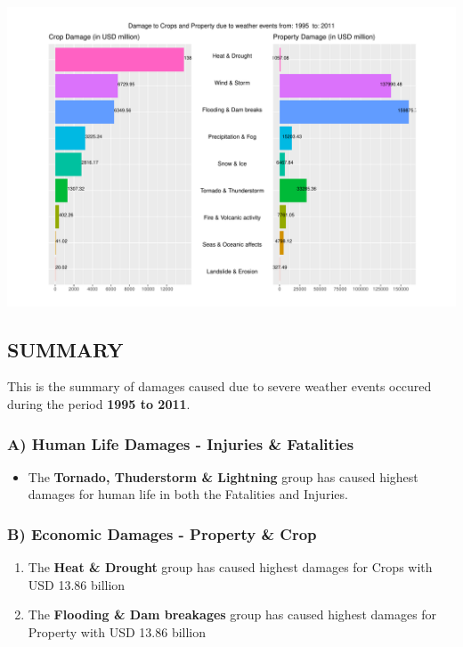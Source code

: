 \documentclass[]{article}
\providecommand{\tightlist}{%
  \setlength{\itemsep}{0pt}\setlength{\parskip}{0pt}}
\begin{document}
\includegraphics{NOAAStormDataAnalysis_files/figure-latex/unnamed-chunk-16-1.pdf}

\subsection{SUMMARY}\label{summary}

This is the summary of damages caused due to severe weather events
occured during the period \textbf{1995 to 2011}.

\subsubsection{A) Human Life Damages - Injuries \&
Fatalities}\label{a-human-life-damages---injuries-fatalities}

\begin{itemize}
\tightlist
\item
  The \textbf{Tornado, Thuderstorm \& Lightning} group has caused
  highest damages for human life in both the Fatalities and Injuries.
\end{itemize}

\subsubsection{B) Economic Damages - Property \&
Crop}\label{b-economic-damages---property-crop}

\begin{enumerate}
\def\labelenumi{\arabic{enumi})}
\tightlist
\item
  The \textbf{Heat \& Drought} group has caused highest damages for
  Crops with USD 13.86 billion\\
\item
  The \textbf{Flooding \& Dam breakages} group has caused highest
  damages for Property with USD 13.86 billion
\end{enumerate}
\end{document}
